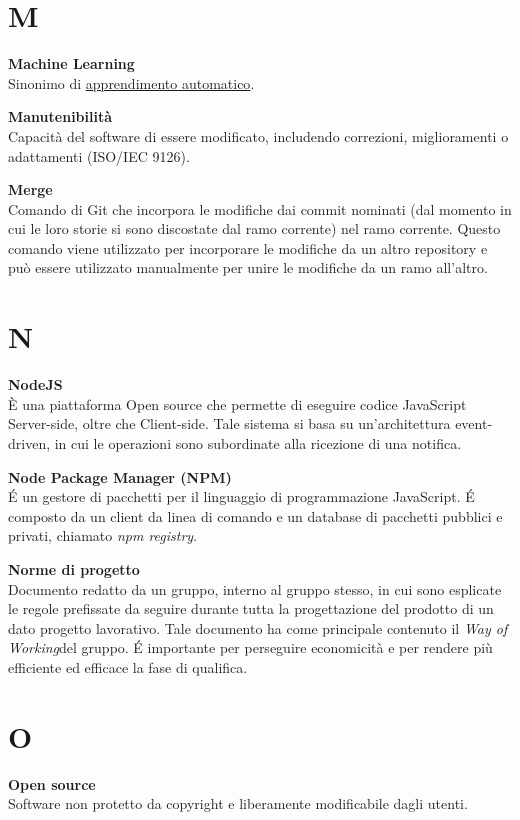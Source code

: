 \documentclass[a4paper, oneside, openany, dvipsnames, table, 12pt]{article}
\begin{document}
\newpage
\section{M}
\textbf{Machine Learning} \\
Sinonimo di \hyperref[par:appr_auto]{apprendimento automatico\glo}.

\textbf{Manutenibilità} \\
Capacità del software di essere modificato, includendo correzioni, miglioramenti o adattamenti (ISO/IEC 9126).

\textbf{Merge} \\
Comando di Git che incorpora le modifiche dai commit nominati (dal momento in cui le loro storie si sono discostate dal ramo corrente) nel ramo corrente. Questo comando viene utilizzato per incorporare le modifiche
da un altro repository e può essere utilizzato manualmente per unire le modifiche da un ramo all’altro.

\newpage
\section{N}
\textbf{NodeJS}\\	
\`E una piattaforma Open source che permette di eseguire codice JavaScript Server-side, oltre che Client-side. Tale sistema si basa su un'architettura event-driven, in cui le operazioni sono subordinate alla ricezione di una notifica.

\textbf{Node Package Manager (NPM)} \\
\'E un gestore di pacchetti per il linguaggio di programmazione JavaScript.
\'E composto da un client da linea di comando e un database di pacchetti pubblici e privati, chiamato \textit{npm registry}. 

\textbf{Norme di progetto} \\
Documento redatto da un gruppo, interno al gruppo stesso, in cui sono esplicate le regole prefissate da seguire durante tutta la progettazione del prodotto di un dato progetto lavorativo. Tale documento ha come principale contenuto il \textit{Way of Working}\glo del gruppo. \'E importante per perseguire economicità e per rendere più efficiente ed efficace la fase di qualifica.

\newpage
\section{O}
\label{par:opens}
\textbf{Open source} \\
Software non protetto da copyright e liberamente modificabile dagli utenti.
\end{document}
